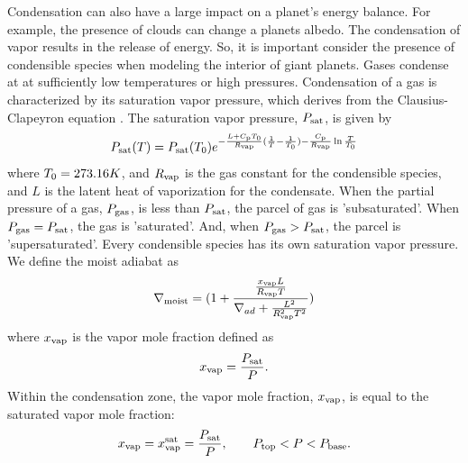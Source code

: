 \documentclass[11pt]{ucscthesisbs}
\begin{document}
Condensation can also have a large impact on a planet's energy balance. For example, the presence of clouds can change a planets albedo. The condensation of vapor results in the release of energy. So, it is important consider the presence of condensible species when modeling the interior of giant planets. Gases condense at at sufficiently low temperatures or high pressures. Condensation of a gas is characterized by its saturation vapor pressure, which derives from the Clausius-Clapeyron equation \citep{sanchez_2011}. The saturation vapor pressure, $P_{\rm sat}$, is given by 
\begin{equation}
  P_{\rm sat}(T) = P_{\rm sat}(T_{\rm 0})e^{-\frac{L + C_{\rm p}T_{\rm 0}}{R_{\rm vap}}(\frac{1}{T} - \frac{1}{T_{\rm 0}}) -\frac{C_{\rm p}}{R_{\rm vap}}\ln{\frac{T}{T_{\rm 0}}}}
  \label{eq:saturation_vapor_pressure}
\end{equation}
where $T_{\rm 0} = 273.16K$, and $R_{\rm vap}$ is the gas constant for the condensible species, and $L$ is the latent heat of vaporization for the condensate. When the partial pressure of a gas, $P_{\rm gas}$, is less than $P_{\rm sat}$, the parcel of gas is 'subsaturated'. When $P_{\rm gas} = P_{\rm sat}$, the gas is 'saturated'. And, when $P_{\rm gas} > P_{\rm sat}$, the parcel is 'supersaturated'. Every condensible species has its own saturation vapor pressure. We define the moist adiabat as \citep{sanchez_2011} 
\begin{equation}
  \nabla_{\rm moist} = (1 + \frac{\frac{x_{\rm vap} L}{R_{\rm vap}T}}{\nabla_{ad} + \frac{L^2}{R_{\rm vap}^2 T^2}} )
\end{equation}
where $x_{\rm vap}$ is the vapor mole fraction defined as
\begin{equation}
x_{\rm vap} =\frac{P_{\rm sat}}{P}.
\end{equation}
Within the condensation zone, the vapor mole fraction, $x_{\rm vap}$, is equal to the saturated vapor mole fraction:
\begin{equation}
x_{\rm vap} = x_{\rm vap}^{\rm sat} = \frac{P_{\rm sat}}{P}, \qquad P_{\rm top} < P < P_{\rm base}.
\end{equation}
\end{document}
